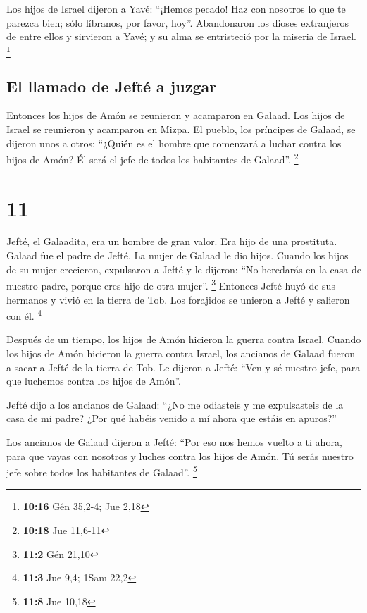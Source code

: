  Los hijos de Israel dijeron a Yavé: ``¡Hemos pecado! Haz
con nosotros lo que te parezca bien; sólo líbranos, por favor, hoy''.
 Abandonaron los dioses extranjeros de entre ellos y
sirvieron a Yavé; y su alma se entristeció por la miseria de Israel.
\footnote{\textbf{10:16} Gén 35,2-4; Jue 2,18}

\hypertarget{el-llamado-de-jeftuxe9-a-juzgar}{%
\subsection{El llamado de Jefté a
juzgar}\label{el-llamado-de-jeftuxe9-a-juzgar}}

 Entonces los hijos de Amón se reunieron y acamparon en
Galaad. Los hijos de Israel se reunieron y acamparon en Mizpa.
 El pueblo, los príncipes de Galaad, se dijeron unos a
otros: ``¿Quién es el hombre que comenzará a luchar contra los hijos de
Amón? Él será el jefe de todos los habitantes de Galaad''. \footnote{\textbf{10:18}
  Jue 11,6-11}

\hypertarget{section-10}{%
\section{11}\label{section-10}}

 Jefté, el Galaadita, era un hombre de gran valor. Era
hijo de una prostituta. Galaad fue el padre de Jefté.  La
mujer de Galaad le dio hijos. Cuando los hijos de su mujer crecieron,
expulsaron a Jefté y le dijeron: ``No heredarás en la casa de nuestro
padre, porque eres hijo de otra mujer''. \footnote{\textbf{11:2} Gén
  21,10}  Entonces Jefté huyó de sus hermanos y vivió en
la tierra de Tob. Los forajidos se unieron a Jefté y salieron con él.
\footnote{\textbf{11:3} Jue 9,4; 1Sam 22,2}

 Después de un tiempo, los hijos de Amón hicieron la
guerra contra Israel.  Cuando los hijos de Amón hicieron
la guerra contra Israel, los ancianos de Galaad fueron a sacar a Jefté
de la tierra de Tob.  Le dijeron a Jefté: ``Ven y sé
nuestro jefe, para que luchemos contra los hijos de Amón''.

 Jefté dijo a los ancianos de Galaad: ``¿No me odiasteis y
me expulsasteis de la casa de mi padre? ¿Por qué habéis venido a mí
ahora que estáis en apuros?''

 Los ancianos de Galaad dijeron a Jefté: ``Por eso nos
hemos vuelto a ti ahora, para que vayas con nosotros y luches contra los
hijos de Amón. Tú serás nuestro jefe sobre todos los habitantes de
Galaad''. \footnote{\textbf{11:8} Jue 10,18}

